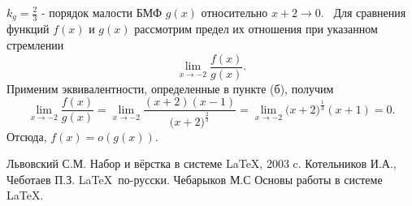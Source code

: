 \documentclass[12pt]{article}
\begin{document}
$k_g = \frac{2}{3}$ - порядок малости БМФ $g(x)$ относительно $x+2\rightarrow0$.
\newpage
{}~Для сравнения функций $f(x)$ и $g(x)$ рассмотрим предел их отношения при указанном стремлении
$$
\lim\limits_{x\rightarrow-2}\dfrac{f(x)}{g(x)}.
$$
Применим эквивалентности, определенные в пункте (б), получим
$$
\lim\limits_{x\rightarrow-2}\dfrac{f(x)}{g(x)} = 
\lim\limits_{x\rightarrow-2}\dfrac{(x+2)(x-1)}{\biggl(x+2\biggl)^\frac{2}{3}} = 
\lim\limits_{x\rightarrow-2}\biggl(x+2\biggl)^\frac{1}{3}(x+1) = 0 .
$$
Отсюда, $f(x) = o(g(x))$.
\newpage
{}
\begin{thebibliography}{99}
 Львовский С.М. Набор и вёрстка в системе \LaTeX, 2003 c.
 Котельников И.А., Чеботаев П.З. \LaTeX~по-русски.
 Чебарыков М.С Основы работы в системе \LaTeX.
\end{thebibliography}
\end{document}
